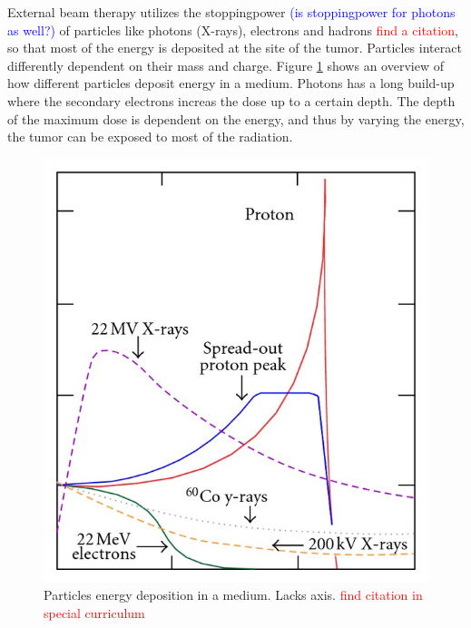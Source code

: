 \documentclass[a4paper,11pt,twoside]{book}
\begin{document}
External beam therapy utilizes the stoppingpower \textcolor{blue}{(is stoppingpower for photons as well?)} of particles like photons (X-rays), electrons and hadrons \textcolor{red}{find a citation}, so that most of the energy is deposited at the site of the tumor. Particles interact differently dependent on their mass and charge. Figure \ref{fig:particles_Edeposition} shows an overview of how different particles deposit energy in a medium. Photons has a long build-up where the secondary electrons increas the dose up to a certain depth. The depth of the maximum dose is dependent on the energy, and thus by varying the energy, the tumor can be exposed to most of the radiation. 


\begin{figure}
	\centering
	\includegraphics[scale=1]{Theory/Bragg-peak-and-Spread-Out-Bragg-Peak-SOBP-for-a-proton-beam-in-comparison-with-photon.jpg}  
	\caption{Particles energy deposition in a medium. Lacks axis. \textcolor{red}{find citation in special curriculum} }
	\label{fig:particles_Edeposition}
\end{figure}
\end{document}
